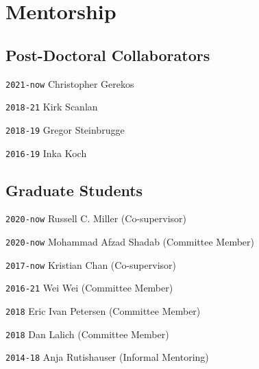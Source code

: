 \section*{Mentorship}

\TabPositions{6em,20em,28em}

\subsection*{Post-Doctoral Collaborators}

\noindent \texttt{2021-now} \tab Christopher Gerekos 

\noindent \texttt{2018-21} \tab Kirk Scanlan 

\noindent \texttt{2018-19} \tab Gregor Steinbrugge

\noindent \texttt{2016-19} \tab Inka Koch

\vspace{-1em}
\subsection*{Graduate Students}

\noindent \texttt{2020-now} \tab Russell C. Miller \tab [MS] \tab (Co-supervisor)

\noindent \texttt{2020-now} \tab Mohammad Afzad Shadab \tab [PhD] \tab (Committee Member)

\noindent \texttt{2017-now} \tab Kristian Chan \tab [PhD] \tab (Co-supervisor)

\noindent \texttt{2016-21} \tab Wei Wei \tab [PhD] \tab (Committee Member)

\noindent \texttt{2018} \tab Eric Ivan Petersen  \tab [PhD] \tab (Committee Member)

\noindent \texttt{2018} \tab Dan Lalich \tab [PhD] \tab (Committee Member)

\noindent \texttt{2014-18} \tab Anja Rutishauser  \tab (Informal Mentoring)

